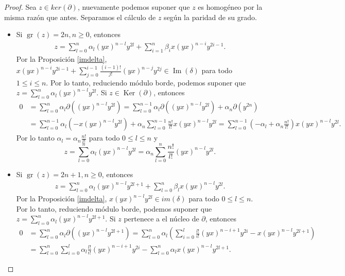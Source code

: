 \documentclass[a4paper,oneside,fleqn,11pt]{article}
\numberwithin{prop}{subsection}
\DeclareMathOperator\Ima{Im}
\DeclareMathOperator\Ker{Ker}
\DeclareMathOperator\gr{gr}
\begin{document}
\begin{proof}
	Sea $z \in ker(\partial)$, nuevamente podemos suponer que $z$ es homogéneo por la misma razón que antes.
	Separamos el cálculo de $z$ según la paridad de su grado.
	\begin{itemize}
		\item Si $\gr(z) = 2n, n \geq 0$, entonces
		\begin{align*}
			z = \sum_{l = 0}^n\alpha_l(yx)^{n - l}y^{2l} + \sum_{i = 1}^n\beta_ix(yx)^{n - i}y^{2i - 1}.
		\end{align*}
		Por la Proposición \ref{imdelta}, $x(yx)^{n - i}y^{2i - 1} + \sum_{j = 0}^{i - 1}\frac{(i-1)!}{j!}(yx)^{n - j}y^{2j} \in \Ima(\delta)$
		para todo $1 \leq i \leq n$.
		Por lo tanto, reduciendo módulo borde, podemos suponer que $z = \sum_{l = 0}^n\alpha_l(yx)^{n - l}y^{2l}$.
		Si $z \in \Ker(\partial)$, entonces
		\begin{align*}
			0 &= \sum_{l = 0}^n\alpha_l\partial((yx)^{n - l}y^{2l})
				= \sum_{l = 0}^{n - 1}\alpha_l\partial((yx)^{n - l}y^{2l}) + \alpha_n\partial(y^{2n})\\
			&= \sum_{l = 0}^{n - 1}\alpha_l(-x(yx)^{n - l}y^{2l}) + \alpha_n\sum_{l = 0}^{n - 1}\frac{n!}{l!}x(yx)^{n - l}y^{2l}
				= \sum_{l = 0}^{n - 1}(-\alpha_l + \alpha_n\frac{n!}{l!})x(yx)^{n - l}y^{2l}.
		\end{align*}
		Por lo tanto $\alpha_l = \alpha_n\frac{n!}{l!}$ para todo $0 \leq l \leq n$ y
		\[
			z = 	\sum_{l = 0}^n\alpha_l(yx)^{n - l}y^{2l} = \alpha_n\sum_{l = 0}^n\frac{n!}{l!}(yx)^{n - l}y^{2l}.
		\]
		\item Si $\gr(z) = 2n + 1, n \geq 0$, entonces
		\begin{align*}
			z = \sum_{l = 0}^n\alpha_l(yx)^{n - l}y^{2l + 1} + \sum_{l = 0}^n\beta_lx(yx)^{n - l}y^{2l}.
		\end{align*}
		Por la Proposición \ref{imdelta}, $x(yx)^{n - l}y^{2l} \in im(\delta)$ para todo $0 \leq l \leq n$.
		Por lo tanto, reduciendo módulo borde, podemos suponer que $z = \sum_{l = 0}^n\alpha_l(yx)^{n - l}y^{2l + 1}$.
		Si $z$ pertenece a el núcleo de $\partial$, entonces
		\begin{align*}
			0 &= \sum_{l = 0}^n\alpha_l\partial((yx)^{n - l}y^{2l + 1})
				= \sum_{l = 0}^n\alpha_l\left(\sum_{i = 0}^l\frac{l!}{i!}(yx)^{n - i + 1}y^{2i} -x(yx)^{n - l}y^{2l + 1}\right)\\
			&= \sum_{l = 0}^n\sum_{i = 0}^l\alpha_l\frac{l!}{i!}(yx)^{n - i + 1}y^{2i} - \sum_{l = 0}^n\alpha_lx(yx)^{n - l}y^{2l + 1}.
		\end{align*}

\end{itemize}
\end{proof}
\end{document}
